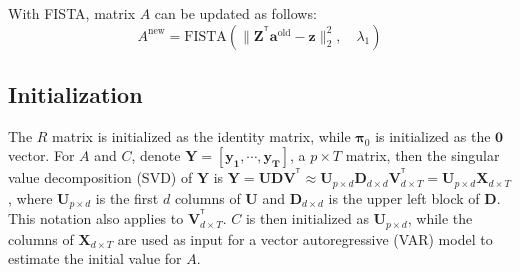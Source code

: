 \documentclass[fleqn,12pt]{article}
\newcommand{\T}{^{\ensuremath{\mathsf{T}}}}           %
\providecommand{\mb}[1]{\boldsymbol{#1}}
\newcommand{\bX}{\mb{X}}
\newcommand{\bY}{\mb{Y}}
\begin{document}
With FISTA, matrix $A$ can be updated as follows:
\begin{equation}\label{eq:updatea}
A^{\text{new}} = \text{FISTA}(\|\mathbf{Z}^{\T}\mathbf{a}^{\text{old}} -\mathbf{z}\|_2^2,\quad \lambda_1)
\end{equation}

\subsection{Initialization}\label{sec:initial}
The $R$ matrix is initialized as the identity matrix, while $\mathbf{\pi}_0$  is initialized as the $\mathbf{0}$ vector. For $A$ and $C$, denote $\bY = \left[\mathbf{y_1},\cdots,\mathbf{y_T}\right]$, a $p\times T$ matrix, then the singular value decomposition (SVD) of $\bY$ is $\bY = \mathbf{UDV^{\T}} \approx \mathbf{U}_{p \times d} \mathbf{D}_{d \times d} \mathbf{V}_{d \times T}^{\T} =\mathbf{U}_{p\times d}\bX_{d \times T}$, where $\mathbf{U}_{p \times d}$ is the first $d$ columns of $\mathbf{U}$ and $\mathbf{D}_{d\times d}$ is the upper left block of $\mathbf{D}$. This notation also applies to $\mathbf{V}^{\T}_{d \times T}$.
$C$ is then initialized as $\mathbf{U}_{p\times d}$, while the columns of $\bX_{d \times T}$ are used as input for a vector autoregressive (VAR) model to estimate the initial value for $A$.
\end{document}
